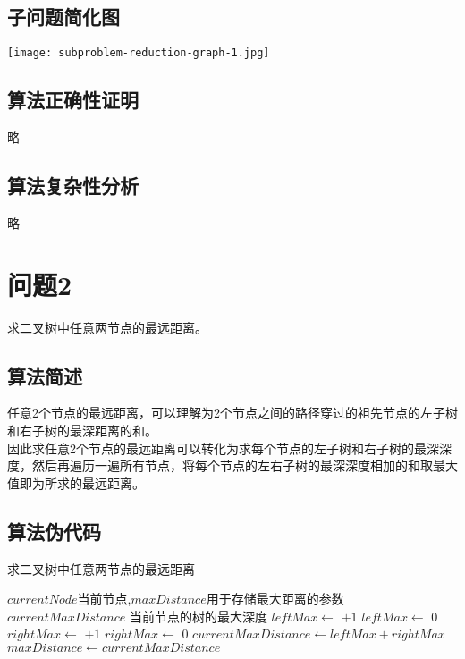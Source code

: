 \documentclass[UTF8]{ctexart}
\begin{document}
\subsection{子问题简化图}
	\texttt{[image: subproblem-reduction-graph-1.jpg]}
	
\subsection{算法正确性证明}
	略

\subsection{算法复杂性分析}
	略
\clearpage

\section{问题2}
求二叉树中任意两节点的最远距离。
\subsection{算法简述}
任意2个节点的最远距离，可以理解为2个节点之间的路径穿过的祖先节点的左子树和右子树的最深距离的和。\\
因此求任意2个节点的最远距离可以转化为求每个节点的左子树和右子树的最深深度，然后再遍历一遍所有节点，将每个节点的左右子树的最深深度相加的和取最大值即为所求的最远距离。
\subsection{算法伪代码}
	\begin{algorithm}[H]
		\caption{求二叉树中任意两节点的最远距离} 
		\begin{algorithmic} %
			\Require   $currentNode$当前节点,$maxDistance$用于存储最大距离的参数
            		\Ensure   $currentMaxDistance$ 当前节点的树的最大深度
				\State $leftMax \gets$  $+1$
			\Else
				\State $leftMax \gets$ $0$
			\EndIf
				\State $rightMax \gets$  $+1$
			\Else
				\State $rightMax \gets$ $0$
			\EndIf
			$currentMaxDistance \gets  leftMax + rightMax$  
				\State $maxDistance \gets currentMaxDistance$
			\EndIf
			\State \Return {}
			\EndFunction
		\end{algorithmic}
	\end{algorithm}
\end{document}
